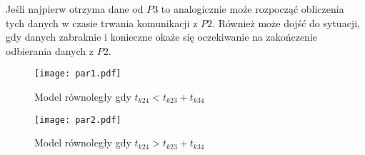 \begin{description}
Jeśli najpierw otrzyma dane od $P3$ to analogicznie może rozpocząć obliczenia tych danych w czasie trwania komunikacji z $P2$.
Również może dojść do sytuacji, gdy danych zabraknie i konieczne okaże się oczekiwanie na zakończenie odbierania danych z $P2$.

\begin{figure}[H]
\centering
\texttt{[image: par1.pdf]}
\caption{Model równoległy gdy $t_{k24} < t_{k23} + t_{k34}$}
\label{fig:par1}
\end{figure}

\begin{figure}[H]
\centering
\texttt{[image: par2.pdf]}
\caption{Model równoległy gdy $t_{k24} > t_{k23} + t_{k34}$}
\label{fig:par2}
\end{figure}

\end{description}

\newpage

